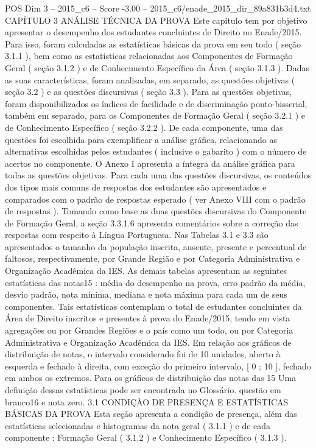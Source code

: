 \begin{textsample}{POS Dim 3 – 2015\_c6 – Score -3.00 – 2015\_c6/enade\_2015\_dir\_89a831b3d4.txt}  \label{ex:f3_pos_218}
CAPÍTULO 3 ANÁLISE TÉCNICA DA PROVA Este capítulo tem por objetivo apresentar o desempenho dos estudantes concluintes de Direito no Enade/2015.
Para isso, foram calculadas as estatísticas básicas da prova em seu todo ( seção 3.1.1 ), bem como as estatísticas relacionadas aos Componentes de Formação Geral ( seção 3.1.2 ) e de Conhecimento Específico da Área ( seção 3.1.3 ).
Dadas as suas características, foram analisadas, em separado, as questões objetivas ( seção 3.2 ) e as questões discursivas ( seção 3.3 ).
Para as questões objetivas, foram disponibilizados os índices de facilidade e de discriminação ponto-bisserial, também em separado, para os Componentes de Formação Geral ( seção 3.2.1 ) e de Conhecimento Específico ( seção 3.2.2 ).
De cada componente, uma das questões foi escolhida para exemplificar a análise gráfica, relacionando as alternativas escolhidas pelos estudantes ( inclusive o gabarito ) com o número de acertos no componente.
O Anexo I apresenta a íntegra da análise gráfica para todas as questões objetivas.
Para cada uma das questões discursivas, os conteúdos dos tipos mais comuns de respostas dos estudantes são apresentados e comparados com o padrão de respostas esperado ( ver Anexo VIII com o padrão de respostas ).
Tomando como base as duas questões discursivas do Componente de Formação Geral, a seção 3.3.1.6 apresenta comentários sobre a correção das respostas com respeito à Língua Portuguesa.
Nas Tabelas 3.1 e 3.3 são apresentados o tamanho da população inscrita, ausente, presente e percentual de faltosos, respectivamente, por Grande Região e por Categoria Administrativa e Organização Acadêmica da IES.
As demais tabelas apresentam as seguintes estatísticas das notas15 : média do desempenho na prova, erro padrão da média, desvio padrão, nota mínima, mediana e nota máxima para cada um de seus componentes.
Tais estatísticas contemplam o total de estudantes concluintes da Área de Direito inscritos e presentes à prova do Enade/2015, tendo em vista agregações ou por Grandes Regiões e o país como um todo, ou por Categoria Administrativa e Organização Acadêmica da IES.
Em relação aos gráficos de distribuição de notas, o intervalo considerado foi de 10 unidades, aberto à esquerda e fechado à direita, com exceção do primeiro intervalo, [ 0 ; 10 ], fechado em ambos os extremos.
Para os gráficos de distribuição das notas das 15 Uma definição dessas estatísticas pode ser encontrada no Glossário. questão em branco16 e nota zero. 3.1 CONDIÇÃO DE PRESENÇA E ESTATÍSTICAS BÁSICAS DA PROVA Esta seção apresenta a condição de presença, além das estatísticas selecionadas e histogramas da nota geral ( 3.1.1 ) e de cada componente : Formação Geral ( 3.1.2 ) e Conhecimento Específico ( 3.1.3 ).

\end{textsample}
